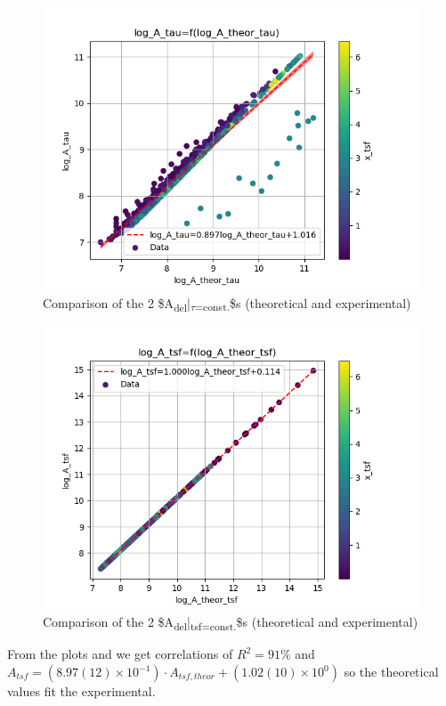 \documentclass[a4paper,twocolumn]{article}
\begin{document}
\begin{figure}[!htpb]
\centering
\includegraphics[width=.9\linewidth]{./figs/log_A_theor_tau-log_A_tau-color_x_tsf.png}
\caption{\label{fig:A_theor_A_exp_tau}Comparison of the 2 \$A\textsubscript{del}|\textsubscript{\(\tau\)=const.}\$s (theoretical and experimental)}
\end{figure}

\begin{figure}[!htpb]
\centering
\includegraphics[width=.9\linewidth]{./figs/log_A_theor_tsf-log_A_tsf-color_x_tsf.png}
\caption{\label{fig:A_theor_A_exp_tsf}Comparison of the 2 \$A\textsubscript{del}|\textsubscript{tsf=const.}\$s (theoretical and experimental)}
\end{figure}


From the plots \cite{fig:A_theor_A_exp_tau} and \cite{fig:A_theor_A_exp_tsf} we get correlations of \(R^2 = 91\%\) \noindent and \(A_{tsf} = (8.97(12) \times 10^{-1})\cdot A_{tsf,theor} + (1.02(10) \times 10^{0})\)  so the theoretical values fit the experimental.
\end{document}
